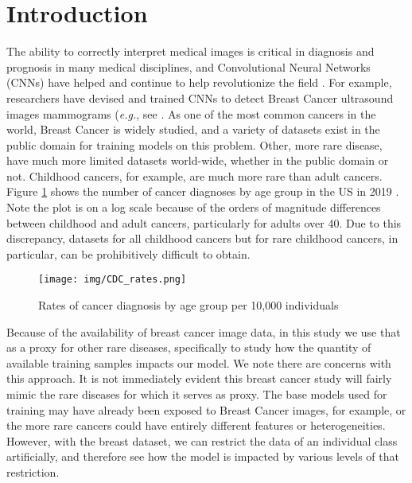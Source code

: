\documentclass[sn-mathphys,Numbered]{sn-jnl}%
\theoremstyle{thmstyleone}%
\theoremstyle{thmstyletwo}%
\theoremstyle{thmstylethree}%
\begin{document}
\section{Introduction}\label{sec_intro}
The ability to correctly interpret medical images is critical in diagnosis and prognosis in many medical disciplines, and Convolutional Neural Networks (CNNs) have helped and continue to help revolutionize the field \cite{2022_survey}.  For example, researchers have devised and trained CNNs to detect Breast Cancer ultrasound images mammograms ({\it e.g.}, see \cite{AREVALO2016248}.  As one of the most common cancers in the world, Breast Cancer is widely studied, and a variety of datasets exist in the public domain for training models on this problem.  Other, more rare disease, have much more limited datasets world-wide, whether in the public domain or not.  Childhood cancers, for example, are much more rare than adult cancers.  Figure \ref{fig:CDC_Rates} shows the number of cancer diagnoses by age group in the US in 2019 \cite{cdc}.  Note the plot is on a log scale because of the orders of magnitude differences between childhood and adult cancers, particularly for adults over 40.  Due to this discrepancy, datasets for all childhood cancers but for rare childhood cancers, in particular, can be prohibitively difficult to obtain.  


\begin{figure}[!htbp]
    \centering

    \texttt{[image: img/CDC\_rates.png]}

    \caption{Rates of cancer diagnosis by age group per 10,000 individuals \cite{cdc}}
    \label{fig:CDC_Rates}
\end{figure}


Because of the availability of breast cancer image data, in this study we use that as a proxy for other rare diseases, specifically to study how the quantity of available training samples impacts our model.  We note there are concerns with this approach.  It is not immediately evident this breast cancer study will fairly mimic the rare diseases for which it serves as proxy.  The base models used for training may have already been exposed to Breast Cancer images, for example, or the more rare cancers could have entirely different features or heterogeneities.   However, with the breast dataset, we can restrict the data of an individual class artificially, and therefore see how the model is impacted by various levels of that restriction.
\end{document}
